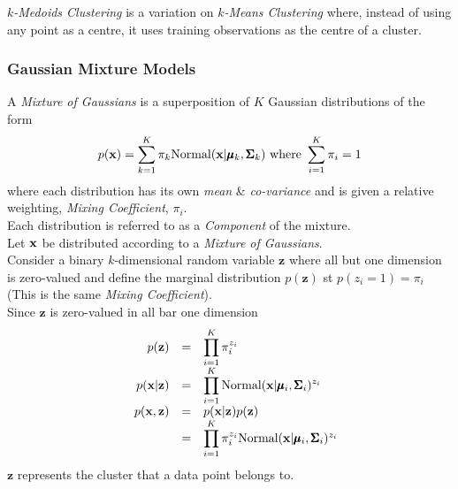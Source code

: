 \documentclass[11pt,a4paper]{article}
\begin{document}
\textit{$k$-Medoids Clustering} is a variation on \textit{$k$-Means Clustering} where, instead of using any point as a centre, it uses training  observations as the centre of a cluster.

\subsubsection{Gaussian Mixture Models}

A \textit{Mixture of Gaussians} is a superposition of $K$ Gaussian distributions of the form
$$p(\textbf{x})=\sum_{k=1}^K\pi_k\text{Normal}(\textbf{x}|\pmb\mu_k,\pmb\Sigma_k)\text{ where }\sum_{i=1}^K\pi_i=1$$
where each distribution has its own \textit{mean} \& \textit{co-variance} and is given a relative weighting, \textit{Mixing Coefficient}, $\pi_i$.\\
\nb Each distribution is referred to as a \textit{Component} of the mixture.\\

Let $\textbf{x}$ be distributed according to a \textit{Mixture of Gaussians}.\\
Consider a binary $k$-dimensional random variable $\textbf{z}$ where all but one dimension is zero-valued and define the  marginal distribution $p(\textbf{z})$ st $p(z_i=1)=\pi_i$ (\nb This is the same \textit{Mixing Coefficient}).\\
Since $\textbf{z}$ is zero-valued in all bar one dimension
\[\begin{array}{rrcl}
&p(\textbf{z})&=&\displaystyle\prod_{i=1}^K\pi_i^{z_i}\\
&p(\textbf{x}|\textbf{z})&=&\displaystyle\prod_{i=1}^K\text{Normal}(\textbf{x}|\pmb\mu_i,\pmb\Sigma_i)^{z_i}\\
&p(\textbf{x},\textbf{z})&=&p(\textbf{x}|\textbf{z})p(\textbf{z})\\
&&=&{\displaystyle\prod_{i=1}^K\pi_i^{z_i}}\text{Normal}(\textbf{x}|\pmb\mu_i,\pmb\Sigma_i)^{z_i}
\end{array}\]
\nb $\textbf{z}$ represents the cluster that a data point belongs to.\\
\end{document}
